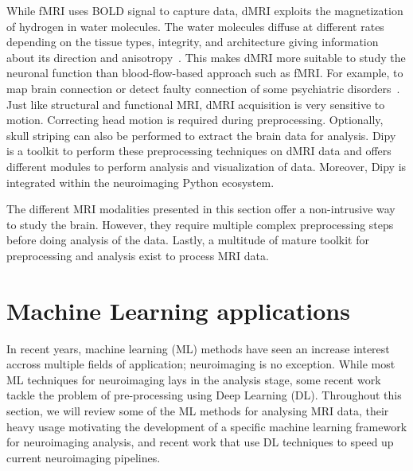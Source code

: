 While fMRI uses BOLD signal to capture data, dMRI exploits the magnetization of hydrogen in water molecules.
The water molecules diffuse at different rates depending on the tissue types, 
integrity, and architecture giving information about its direction and anisotropy~\cite{Soares2013-hw}.
This makes dMRI more suitable to study the neuronal function than blood-flow-based approach such as fMRI.
For example, to map brain connection or detect faulty connection of some psychiatric disorders~\cite{Le_Bihan2015-vp}.
Just like structural and functional MRI, dMRI acquisition is very sensitive to motion.
Correcting head motion is required during preprocessing.
Optionally, skull striping can also be performed to extract the brain data for analysis.
Dipy~\cite{Garyfallidis2014-ve} is a toolkit to perform these preprocessing techniques
on dMRI data and offers different modules to perform analysis and visualization of data.
Moreover, Dipy is integrated within the neuroimaging Python ecosystem.

The different MRI modalities presented in this section offer a non-intrusive way to study the brain.
However, they require multiple complex preprocessing steps before doing analysis of the data.
Lastly, a multitude of mature toolkit for preprocessing and analysis exist to process MRI data.


\section{Machine Learning applications} %
In recent years, machine learning (ML) methods have seen an increase interest 
accross multiple fields of application; neuroimaging is no exception.
While most ML techniques for neuroimaging lays in the analysis stage, some recent 
work tackle the problem of pre-processing using Deep Learning (DL).
Throughout this section, we will review some of the ML methods for analysing MRI 
data, their heavy usage motivating the development of a specific machine learning
framework for neuroimaging analysis, and recent work that use DL techniques to 
speed up current neuroimaging pipelines.

